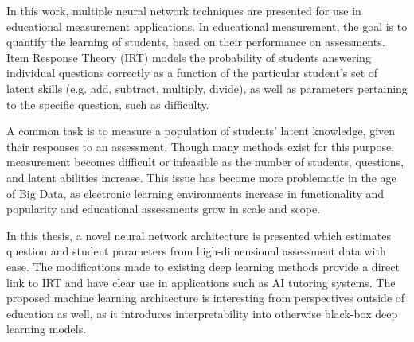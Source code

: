 In this work, multiple neural network techniques are presented for use in educational measurement applications. In educational measurement, the goal is to quantify the learning of students, based on their performance on assessments. Item Response Theory (IRT) models the probability of students answering individual questions correctly as a function of the particular student's set of latent skills (e.g. add, subtract, multiply, divide), as well as parameters pertaining to the specific question, such as difficulty.

A common task is to measure a population of students' latent knowledge, given their responses to an assessment. Though many methods exist for this purpose, measurement becomes difficult or infeasible as the number of students, questions, and latent abilities increase. This issue has become more problematic in the age of Big Data, as electronic learning environments increase in functionality and popularity and educational assessments grow in scale and scope.

In this thesis, a novel neural network architecture is presented which estimates question and student parameters from high-dimensional assessment data with ease. The modifications made to existing deep learning methods provide a direct link to IRT and have clear use in applications such as AI tutoring systems. The proposed machine learning architecture is interesting from perspectives outside of education as well, as it introduces interpretability into otherwise black-box deep learning models.


